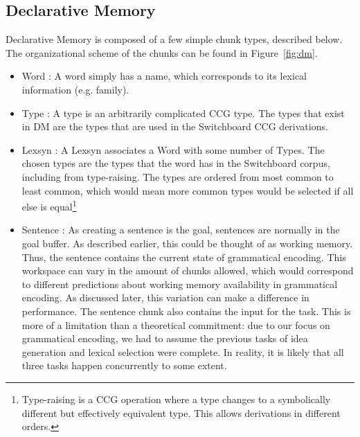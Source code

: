 \subsection{Declarative Memory}\label{sec:dm}
Declarative Memory is composed of a few simple chunk types, described below. The organizational scheme of the chunks can be found in Figure~\ref{fig:dm}.
\begin{itemize}
\item Word : A word simply has a name, which corresponds to its lexical information (e.g. family).
\item Type : A type is an arbitrarily complicated CCG type. The types that exist in DM are the types that are used in the Switchboard CCG derivations.
\item Lexsyn : A Lexsyn associates a Word with some number of Types. The chosen types are the types that the word has in the Switchboard corpus, including from type-raising. The types are ordered from most common to least common, which would mean more common types would be selected if all else is equal\footnote{Type-raising is a CCG operation where a type changes to a symbolically different but effectively equivalent type. This allows derivations in different orders.}
\item Sentence : As creating a sentence is the goal, sentences are normally in the goal buffer. As described earlier, this could be thought of as working memory. Thus, the sentence contains the current state of grammatical encoding. This workspace can vary in the amount of chunks allowed, which would correspond to different predictions about working memory availability in grammatical encoding. As discussed later, this variation can make a difference in performance. The sentence chunk also contains the input for the task. This is more of a limitation than a theoretical commitment: due to our focus on grammatical encoding, we had to assume the previous tasks of idea generation and lexical selection were complete. In reality, it is likely that all three tasks happen concurrently to some extent.
\end{itemize}


